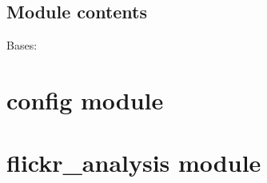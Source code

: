 \documentclass[letterpaper,10pt,english]{sphinxmanual}
\begin{document}
\subsection{Module contents}
\label{apis:module-contents}\label{apis:module-apis}

\begin{fulllineitems}
\label{apis:apis.Query}
Bases: 

\end{fulllineitems}



\section{config module}
\label{config:module-config}\label{config::doc}\label{config:config-module}

\section{flickr\_analysis module}
\label{flickr_analysis:flickr-analysis-module}\label{flickr_analysis::doc}\label{flickr_analysis:module-flickr_analysis}

\begin{fulllineitems}
\label{flickr_analysis:flickr_analysis.compute_geotag_usage}
\end{fulllineitems}


\begin{fulllineitems}
\label{flickr_analysis:flickr_analysis.plot_normalized_tag_usage}
\end{fulllineitems}


\begin{fulllineitems}
\label{flickr_analysis:flickr_analysis.plot_photos_per_year}
\end{fulllineitems}
\end{document}
